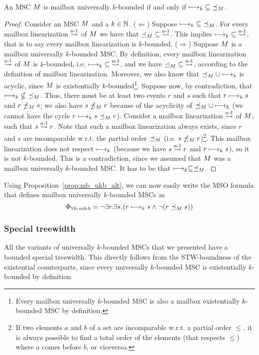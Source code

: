 \begin{proposition}\label{prop:mb_ukb_alt}
	An MSC $M$ is mailbox universally $k$-bounded if and only if $\longmapsto_k \;\subseteq\; \preceq_M$.
\end{proposition}
\begin{proof}
	Consider an MSC $M$ and a $k \in \mathbb{N}$.\newline
	($\Leftarrow$) Suppose $\longmapsto_k \;\subseteq\; \preceq_M$. For every mailbox linearization $\overset{\text{n-1}}{\rightsquigarrow}$ of $M$ we have that $\preceq_M \;\subseteq\; \overset{\text{n-1}}{\rightsquigarrow}$. This implies $\longmapsto_k \;\subseteq\; \overset{\text{n-1}}{\rightsquigarrow}$, that is to say every mailbox linearization is $k$-bounded.\newline
	($\Rightarrow$) Suppose $M$ is a mailbox universally $k$-bounded MSC. By definition, every mailbox linearization $\overset{\text{n-1}}{\rightsquigarrow}$ of $M$ is $k$-bounded, i.e. $\longmapsto_k \;\subseteq\; \overset{\text{n-1}}{\rightsquigarrow}$, and we have $\preceq_M \;\subseteq\; \overset{\text{n-1}}{\rightsquigarrow}$, according to the definition of mailbox linearization. Moreover, we also know that $\preceq_M \cup \longmapsto_k$ is acyclic, since $M$ is existentially $k$-bounded\footnote{Every mailbox universally $k$-bounded MSC is also a mailbox existentially $k$-bounded MSC by definition.}. Suppose now, by contradiction, that $\longmapsto_k \;\nsubseteq\; \preceq_M$. Thus, there must be at least two events $r$ and $s$ such that $r \longmapsto_k s$ and $r \npreceq_M s$; we also have $s \npreceq_M r$ because of the acyclicity of $\preceq_M \cup \longmapsto_k$ (we cannot have the cycle $r \longmapsto_k s \preceq_M r$). Consider a mailbox linearization $\overset{\text{n-1}}{\rightsquigarrow}$  of $M$, such that $s \overset{\text{n-1}}{\rightsquigarrow} r$. Note that such a mailbox linearization always exists, since $r$ and $s$ are incomparable w.r.t. the partial order $\preceq_M$ (i.e. $s \npreceq_M r$)\footnote{If two elements $a$ and $b$ of a set are incomparable w.r.t. a partial order $\le$, it is always possible to find a total order of the elements (that respects $\le$) where $a$ comes before $b$, or viceversa.}. This mailbox linearization does not respect $\longmapsto_k$ (because we have $s \overset{\text{n-1}}{\rightsquigarrow} r$ and $r \longmapsto_k s$), so it is not $k$-bounded. This is a contradiction, since we assumed that $M$ was a mailbox universally $k$-bounded MSC. It has to be that $\longmapsto_k \subseteq \preceq_M$.
\end{proof}

Using Proposition~\ref{prop:mb_ukb_alt}, we can now easily write the MSO formula that defines mailbox universally $k$-bounded MSCs as
\[ \Phi_{\forall k\text{-}mb\text{-}b} = \neg \exists r.\exists s.(r \longmapsto_k s \wedge \neg(r \preceq_M s)) \]

\subsubsection{Special treewidth}

All the variants of universally $k$-bounded MSCs that we presented have a bounded special treewidth. This directly follows from the STW-boundness of the existential counterparts, since every universally $k$-bounded MSC is existentially $k$-bounded by definition.
